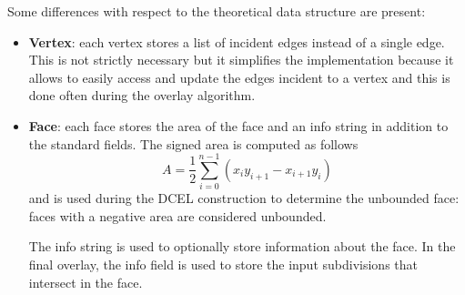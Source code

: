 Some differences with respect to the theoretical data structure are present:
\begin{itemize}
    \item \textbf{Vertex}: each vertex stores a list of incident edges instead of a single edge. This is not strictly necessary but it simplifies the implementation because it allows to easily access and update the edges incident to a vertex and this is done often during the overlay algorithm.
    \item \textbf{Face}: each face stores the area of the face and an info string in addition to the standard fields. The signed area is computed as follows
          \begin{equation*}
              A = \frac{1}{2} \sum_{i=0}^{n-1} (x_i y_{i+1} - x_{i+1} y_i)
          \end{equation*}
          and is used during the DCEL construction to determine the unbounded face: faces with a negative area are considered unbounded.

          The info string is used to optionally store information about the face. In the final overlay, the info field is used to store the input subdivisions that intersect in the face.
\end{itemize}

